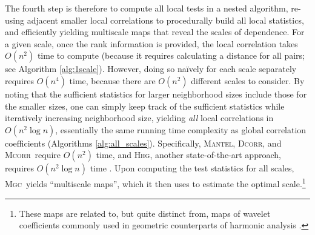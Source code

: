 \documentclass[11pt]{article}
\providecommand{\sct}[1]{{\normalfont\textsc{#1}}}
\newcommand{\Mgc}{\sct{Mgc}}
\newcommand{\Hhg}{\sct{Hhg}}
\newcommand{\Dcorr}{\sct{Dcorr}}
\newcommand{\Mcorr}{\sct{Mcorr}}
\newcommand{\Mantel}{\sct{Mantel}}
\begin{document}


The fourth step is therefore to compute all local tests in a nested algorithm, re-using adjacent smaller local correlations to procedurally build all local statistics, and efficiently yielding multiscale maps that reveal the scales of dependence. 
For a given scale, once the rank information is provided, the local correlation takes $O(n^2)$ time to compute (because it requires calculating a distance for all pairs; see Algorithm \ref{alg:1scale}). 
% 
However, doing so na\"ively for each scale separately requires $O(n^4)$ time, because there are $O(n^2)$ different scales to consider. 
% 
By noting that the sufficient statistics for larger neighborhood sizes include those for the smaller sizes, one can simply keep track of the sufficient statistics while iteratively increasing neighborhood size, yielding  \emph{all} local correlations in $O(n^2 \log n)$, essentially the same running time complexity as  global correlation coefficients (Algorithms \ref{alg:all_scales}). Specifically, \Mantel, \Dcorr, and \Mcorr~require $O(n^2)$ time, and \Hhg, another state-of-the-art approach,  requires $O(n^2 \log n)$ time \cite{HellerGorfine2013}.  Upon computing the test statistics for all scales, \Mgc~yields ``multiscale maps'', which it then uses to estimate the optimal scale.\footnote{These maps are  related to, but quite distinct from, maps of wavelet coefficients commonly used in geometric counterparts of harmonic analysis \cite{Allard2012,MMS:NoisyDictionaryLearning}.}
\end{document}
